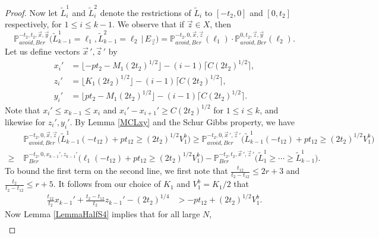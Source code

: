 \begin{proof}
	Now let $\tilde{L}_i^1$ and $\tilde{L}_i^2$ denote the restrictions of $\tilde{L}_i$ to $[-t_2,0]$ and $[0,t_2]$ respectively, for $1\leq i\leq k-1$. We observe that if $\vec{z}\in X$, then
	\begin{equation}\label{5.10split}
	\mathbb{P}^{-t_2,t_2,\vec{x},\vec{y}}_{avoid,Ber}\big(\tilde{L}^1_{k-1} = \ell_1, \tilde{L}^2_{k-1} = \ell_2 \, |\, E_{\vec{z}}\big) = \mathbb{P}^{-t_2,0,\vec{x},\vec{z}}_{avoid,Ber}(\ell_1)\cdot\mathbb{P}^{0,t_2,\vec{z},\vec{y}}_{avoid,Ber}(\ell_2).
	\end{equation}
	Let us define vectors $\vec{x}\,', \vec{z}\,'$ by
	\begin{align*}
	x_i' &= \lfloor -pt_2 - M_1(2t_2)^{1/2}\rfloor - (i-1)\lceil C(2t_2)^{1/2}\rceil,\\
	z_i' &= \lfloor K_1(2t_2)^{1/2}\rfloor - (i-1)\lceil C(2t_2)^{1/2}\rceil,\\
	y_i' &= \lfloor pt_2 - M_1(2t_2)^{1/2}\rfloor - (i-1)\lceil C(2t_2)^{1/2}\rceil.
	\end{align*}
	Note that $x_i' \leq x_{k-1} \leq x_i$ and $x_i' - x_{i+1}' \geq C(2t_2)^{1/2}$ for $1\leq i\leq k$, and likewise for $z_i',y_i'$. By Lemma \ref{MCLxy} and the Schur Gibbs property, we have
	\begin{equation}\label{5.10separate}
	\begin{split}
	&\mathbb{P}^{-t_2,0,\vec{x},\vec{z}}_{avoid,Ber}\Big(\tilde{L}^1_{k-1}(-t_{12}) + pt_{12} \geq (2t_2)^{1/2}V_1^b\Big) \geq \mathbb{P}^{-t_2,0,\vec{x}\,',\vec{z}\,'}_{avoid,Ber}\Big(\tilde{L}^1_{k-1}(-t_{12}) + pt_{12} \geq (2t_2)^{1/2}V_1^b\Big)\\ \geq \; & \mathbb{P}^{-t_2,0,x_{k-1}',z_{k-1}'}_{Ber}\Big(\ell_1(-t_{12}) + pt_{12} \geq (2t_2)^{1/2}V_1^b\Big) - \mathbb{P}^{-t_2,t_2,\vec{x}\,',\vec{z}\,'}_{Ber}\big(\tilde{L}^1_1 \geq \cdots \geq \tilde{L}_{k-1}^1\big).
	\end{split}
	\end{equation} 
	To bound the first term on the second line, we first note that $\frac{t_{12}}{t_2-t_{12}} \leq 2r+3$ and $\frac{t_2}{t_2-t_{12}} \leq r+5$. It follows from our choice of $K_1$ and $V_1^b = K_1/2$ that 
	\begin{align*}
	\frac{t_{12}}{t_2}x_{k-1}' + \frac{t_2-t_{12}}{t_2}z_{k-1}' - (2t_2)^{1/4} &> -pt_{12} + (2t_2)^{1/2}V_1^b.
	\end{align*}
	Now Lemma \ref{LemmaHalfS4} implies that for all large $N$,
	\begin{equation}\label{5.10third}
	\begin{split}

\end{split}
\end{equation}
\end{proof}
